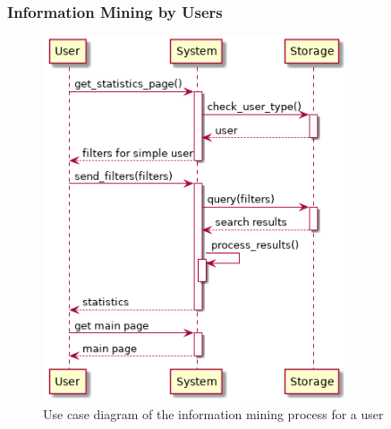 \subsubsection{Information Mining by Users}

\newpage
\begin{figure}[htp]
	\centering
	\includegraphics[width=0.8\textwidth]{images/useCases/information_mining.png}
	\caption{Use case diagram of the information mining process for a user}
	\label{fig:reportmanagement}
\end{figure}
\newpage
